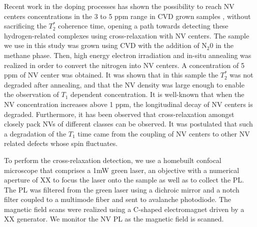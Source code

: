 \documentclass[9pt,twocolumn,twoside]{osajnl}
\begin{document}
Recent work in the doping processes has shown the possibility to reach NV centers concentrations in the 3 to 5 ppm range in CVD grown samples \cite{Edmonds, TALLAIRE2020421, MINDARAVA2020182}, without sacrificing the $T_2^*$ coherence time, opening a path towards detecting these hydrogen-related complexes using cross-relaxation with NV centers.
The sample we use in this study was grown using CVD with the addition of N$_2$0 in the methane phase. Then, high energy electron irradiation and in-situ annealing was realized in order to convert the nitrogen into NV centers. A concentration of 5 ppm of NV center was obtained.
It was shown that in this sample the $T_2^*$ was not degraded after annealing, and that the NV density was large enough to enable the observation of $T_1$ dependent concentration.  It is well-known that when the NV concentration increases above 1 ppm, the longitudinal decay of NV centers is degraded. 
Furthermore, it has been observed that cross-relaxation amongst closely pack NVs of different classes can be observed.
It was postulated that such a degradation of the $T_1$ time came from the coupling of NV centers to other NV related defects whose spin fluctuates. 
 
To perform the cross-relaxation detection, we use a homebuilt confocal microscope that comprises a 1mW green laser, an objective with a numerical aperture of XX to focus the laser onto the sample as well as to collect the PL. The PL was filtered from the green laser using a dichroic mirror and a notch filter coupled to a multimode fiber and sent to avalanche photodiode. The magnetic field scans were realized using a C-shaped electromagnet driven by a XX generator.  We monitor the NV PL as the magnetic field is scanned. 
\end{document}

